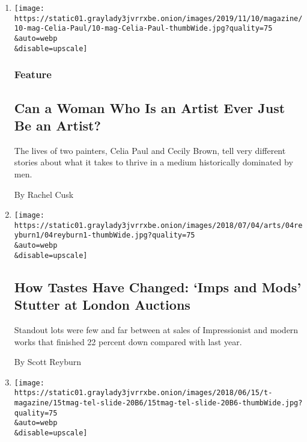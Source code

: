 \begin{enumerate}
\def\labelenumi{\arabic{enumi}.}
\item
  \href{/2019/11/07/magazine/women-art-celia-paul-cecily-brown.html}{}

  \texttt{[image: https://static01.graylady3jvrrxbe.onion/images/2019/11/10/magazine/10-mag-Celia-Paul/10-mag-Celia-Paul-thumbWide.jpg?quality=75\\\&auto=webp\\\&disable=upscale]}

  \hypertarget{feature}{%
  \subsubsection{Feature}\label{feature}}

  \hypertarget{can-a-woman-who-is-an-artist-ever-just-be-an-artist}{%
  \subsection{Can a Woman Who Is an Artist Ever Just Be an
  Artist?}\label{can-a-woman-who-is-an-artist-ever-just-be-an-artist}}

  The lives of two painters, Celia Paul and Cecily Brown, tell very
  different stories about what it takes to thrive in a medium
  historically dominated by men.

  By Rachel Cusk
\item
  \href{/2018/06/22/arts/design/impressionist-modern-auctions-london.html}{}

  \texttt{[image: https://static01.graylady3jvrrxbe.onion/images/2018/07/04/arts/04reyburn1/04reyburn1-thumbWide.jpg?quality=75\\\&auto=webp\\\&disable=upscale]}

  \hypertarget{how-tastes-have-changed-imps-and-mods-stutter-at-london-auctions}{%
  \subsection{How Tastes Have Changed: `Imps and Mods' Stutter at London
  Auctions}\label{how-tastes-have-changed-imps-and-mods-stutter-at-london-auctions}}

  Standout lots were few and far between at sales of Impressionist and
  modern works that finished 22 percent down compared with last year.

  By Scott Reyburn
\item
  \href{/2018/06/15/t-magazine/karu-rugs-cecilia-vicuna-art-editors-picks.html}{}

  \texttt{[image: https://static01.graylady3jvrrxbe.onion/images/2018/06/15/t-magazine/15tmag-tel-slide-20B6/15tmag-tel-slide-20B6-thumbWide.jpg?quality=75\\\&auto=webp\\\&disable=upscale]}


\end{enumerate}

